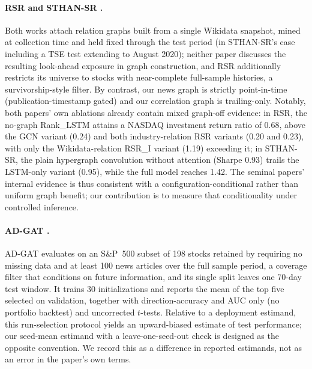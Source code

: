 \documentclass{article}
\begin{document}
\paragraph{RSR \citep{feng2019temporal} and STHAN-SR \citep{sawhney2021sthansr}.} Both works attach relation graphs built from a single Wikidata snapshot, mined at collection time and held fixed through the test period (in STHAN-SR's case including a TSE test extending to August 2020); neither paper discusses the resulting look-ahead exposure in graph construction, and RSR additionally restricts its universe to stocks with near-complete full-sample histories, a survivorship-style filter. By contrast, our news graph is strictly point-in-time (publication-timestamp gated) and our correlation graph is trailing-only. Notably, both papers' own ablations already contain mixed graph-off evidence: in RSR, the no-graph Rank\_LSTM attains a NASDAQ investment return ratio of 0.68, above the GCN variant (0.24) and both industry-relation RSR variants (0.20 and 0.23), with only the Wikidata-relation RSR\_I variant (1.19) exceeding it; in STHAN-SR, the plain hypergraph convolution without attention (Sharpe 0.93) trails the LSTM-only variant (0.95), while the full model reaches 1.42. The seminal papers' internal evidence is thus consistent with a configuration-conditional rather than uniform graph benefit; our contribution is to measure that conditionality under controlled inference.

\paragraph{AD-GAT \citep{cheng2021adgat}.} AD-GAT evaluates on an S\&P~500 subset of 198 stocks retained by requiring no missing data and at least 100 news articles over the full sample period, a coverage filter that conditions on future information, and its single split leaves one 70-day test window. It trains 30 initializations and reports the mean of the top five selected on validation, together with direction-accuracy and AUC only (no portfolio backtest) and uncorrected $t$-tests. Relative to a deployment estimand, this run-selection protocol yields an upward-biased estimate of test performance; our seed-mean estimand with a leave-one-seed-out check is designed as the opposite convention. We record this as a difference in reported estimands, not as an error in the paper's own terms.
\end{document}
